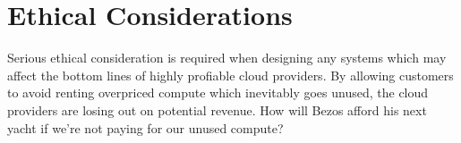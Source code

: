 \chapter{Ethical Considerations}
Serious ethical consideration is required when designing any systems which may affect the bottom lines of highly profiable cloud providers. By allowing customers to avoid renting overpriced compute which inevitably goes unused, the cloud providers are losing out on potential revenue. How will Bezos afford his next yacht if we're not paying for our unused compute?
